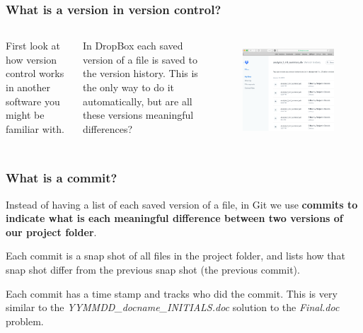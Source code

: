 \documentclass[aspectratio=169]{beamer} %
\begin{document}
\begin{frame}
\frametitle{What is a version in version control?}

	\begin{columns}[c]

		First look at how version control works in another software you might be familiar with.

		\vspace{.5cm}

		In DropBox each saved version of a file is saved to the version history. This is the only way to do it automatically, but are all these versions meaningful differences?

		\begin{figure}
			\centering
			\includegraphics[width=1\linewidth]{../../Common-Resources/img/dropbox_versioncontrol}
			\label{fig:dropboxversioncontrol}
		\end{figure}

	\end{columns}


\end{frame}

\begin{frame}
\frametitle{What is a commit?}

	Instead of having a list of each saved version of a file, in Git we use \textbf{commits to indicate what is each meaningful difference between two versions of our project folder}.

	\vspace{.25cm}

	Each commit is a snap shot of all files in the project folder, and lists how that snap shot differ from the previous snap shot (the previous commit).

	\vspace{.25cm}

	Each commit has a time stamp and tracks who did the commit. This is very similar to the \textit{YYMMDD\_docname\_INITIALS.doc} solution to the \textit{Final.doc} problem.

\end{frame}
\end{document}
